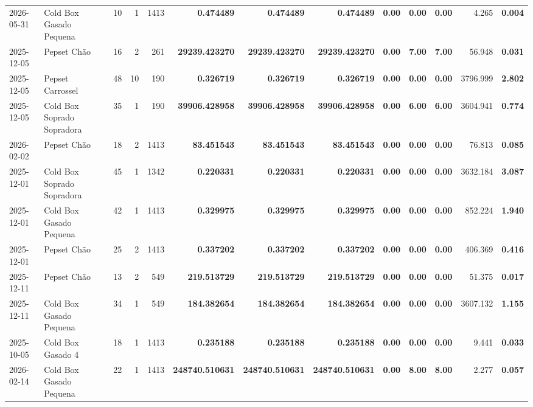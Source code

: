 {\begin{center}
{\begin{tabular}{@{}llrrrrrrrrrrr@{}}
2026-05-31 & Cold Box Gasado Pequena & 10 & 1 & 1413 & \textbf{0.474489} & \textbf{0.474489} & \textbf{0.474489} & \textbf{0.00} & \textbf{0.00} & \textbf{0.00} & 4.265 & \textbf{0.004} \\
2025-12-05 & Pepset Chão & 16 & 2 & 261 & \textbf{29239.423270} & \textbf{29239.423270} & \textbf{29239.423270} & \textbf{0.00} & \textbf{7.00} & \textbf{7.00} & 56.948 & \textbf{0.031} \\
2025-12-05 & Pepset Carrossel & 48 & 10 & 190 & \textbf{0.326719} & \textbf{0.326719} & \textbf{0.326719} & \textbf{0.00} & \textbf{0.00} & \textbf{0.00} & 3796.999 & \textbf{2.802} \\
2025-12-05 & Cold Box Soprado Sopradora & 35 & 1 & 190 & \textbf{39906.428958} & \textbf{39906.428958} & \textbf{39906.428958} & \textbf{0.00} & \textbf{6.00} & \textbf{6.00} & 3604.941 & \textbf{0.774} \\
2026-02-02 & Pepset Chão & 18 & 2 & 1413 & \textbf{83.451543} & \textbf{83.451543} & \textbf{83.451543} & \textbf{0.00} & \textbf{0.00} & \textbf{0.00} & 76.813 & \textbf{0.085} \\
2025-12-01 & Cold Box Soprado Sopradora & 45 & 1 & 1342 & \textbf{0.220331} & \textbf{0.220331} & \textbf{0.220331} & \textbf{0.00} & \textbf{0.00} & \textbf{0.00} & 3632.184 & \textbf{3.087} \\
2025-12-01 & Cold Box Gasado Pequena & 42 & 1 & 1413 & \textbf{0.329975} & \textbf{0.329975} & \textbf{0.329975} & \textbf{0.00} & \textbf{0.00} & \textbf{0.00} & 852.224 & \textbf{1.940} \\
2025-12-01 & Pepset Chão & 25 & 2 & 1413 & \textbf{0.337202} & \textbf{0.337202} & \textbf{0.337202} & \textbf{0.00} & \textbf{0.00} & \textbf{0.00} & 406.369 & \textbf{0.416} \\
2025-12-11 & Pepset Chão & 13 & 2 & 549 & \textbf{219.513729} & \textbf{219.513729} & \textbf{219.513729} & \textbf{0.00} & \textbf{0.00} & \textbf{0.00} & 51.375 & \textbf{0.017} \\
2025-12-11 & Cold Box Gasado Pequena & 34 & 1 & 549 & \textbf{184.382654} & \textbf{184.382654} & \textbf{184.382654} & \textbf{0.00} & \textbf{0.00} & \textbf{0.00} & 3607.132 & \textbf{1.155} \\
2025-10-05 & Cold Box Gasado 4 & 18 & 1 & 1413 & \textbf{0.235188} & \textbf{0.235188} & \textbf{0.235188} & \textbf{0.00} & \textbf{0.00} & \textbf{0.00} & 9.441 & \textbf{0.033} \\
2026-02-14 & Cold Box Gasado Pequena & 22 & 1 & 1413 & \textbf{248740.510631} & \textbf{248740.510631} & \textbf{248740.510631} & \textbf{0.00} & \textbf{8.00} & \textbf{8.00} & 2.277 & \textbf{0.057} \\

\end{tabular}}
\end{center}}
